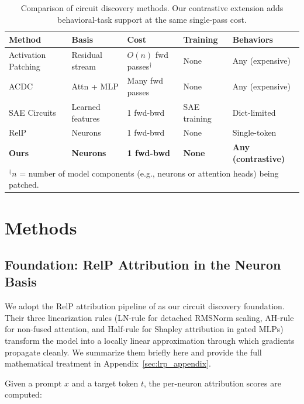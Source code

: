 \documentclass[11pt]{article}
\begin{document}
\begin{table}[htbp]
\centering
\caption{Comparison of circuit discovery methods. Our contrastive extension adds behavioral-task support at the same single-pass cost.}
\label{tab:landscape}
\footnotesize
\begin{tabular}{lllll}
\toprule
\textbf{Method} & \textbf{Basis} & \textbf{Cost} & \textbf{Training} & \textbf{Behaviors} \\
\midrule
Activation Patching & Residual stream & $O(n)$ fwd passes$^\dagger$ & None & Any (expensive) \\
ACDC~\citep{conmy2023acdc} & Attn + MLP & Many fwd passes & None & Any (expensive) \\
SAE Circuits~\citep{marks2024sparse} & Learned features & 1 fwd-bwd & SAE training & Dict-limited \\
RelP~\citep{arora2025circuits} & Neurons & 1 fwd-bwd & None & Single-token \\
\textbf{Ours} & \textbf{Neurons} & \textbf{1 fwd-bwd} & \textbf{None} & \textbf{Any (contrastive)} \\
\bottomrule
\multicolumn{5}{l}{\footnotesize $^\dagger$$n$ = number of model components (e.g., neurons or attention heads) being patched.}
\end{tabular}
\end{table}


\section{Methods}
\label{sec:method}

\subsection{Foundation: RelP Attribution in the Neuron Basis}
\label{sec:foundation}

We adopt the RelP attribution pipeline of \citet{arora2025circuits} as our circuit discovery foundation.
Their three linearization rules (LN-rule for detached RMSNorm scaling, AH-rule for non-fused attention, and Half-rule for Shapley attribution in gated MLPs) transform the model into a locally linear approximation through which gradients propagate cleanly.
We summarize them briefly here and provide the full mathematical treatment in Appendix~\ref{sec:lrp_appendix}.

Given a prompt $x$ and a target token $t$, the per-neuron attribution scores are computed:
\end{document}
